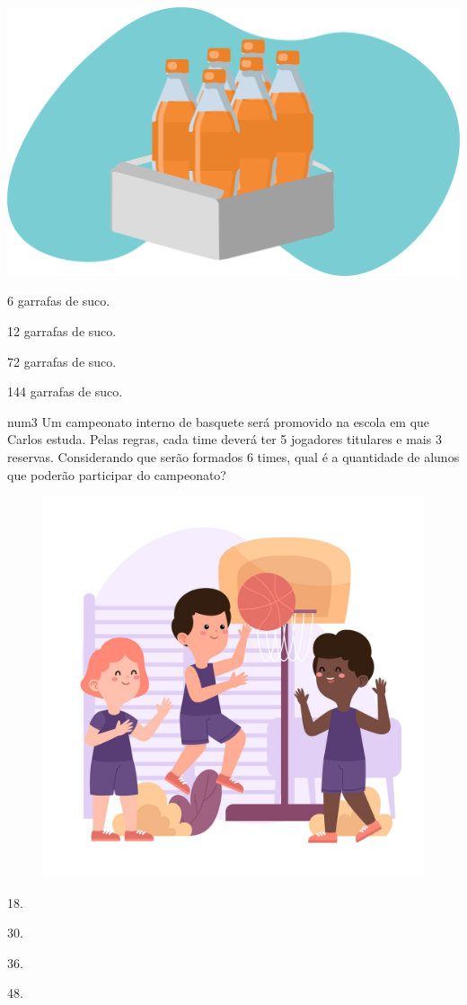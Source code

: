 \begin{minipage}{.5\textwidth}
\includegraphics[width=\textwidth]{./media/image26.png}
\end{minipage}
\begin{minipage}{.5\textwidth}
\begin{escolha}
\item
  6 garrafas de suco.
\item
  12 garrafas de suco.
\item
  72 garrafas de suco.
\item
  144 garrafas de suco.
\end{escolha}
\end{minipage}

num{3} Um campeonato interno de basquete será promovido na escola em que Carlos
estuda. Pelas regras, cada time deverá ter 5 jogadores titulares e mais 3 reservas. Considerando que serão formados 6 times, qual é a quantidade de alunos que poderão participar do campeonato?

\begin{figure}[htpb!]
\centering
\includegraphics[width=.6\textwidth]{./media/image16e.jpeg}
\end{figure}

\begin{multicols}{2}
\begin{escolha}
\item
  18.
\item
  30.
\item
  36.
\item
  48.
\end{escolha}
\end{multicols}
